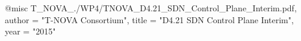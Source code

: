 @misc{ T_NOVA_./WP4/TNOVA_D4.21_SDN_Control_Plane_Interim.pdf,
       author = "{T-NOVA Consortium}",
       title = "D4.21 SDN Control Plane Interim",
       year = "2015" }
